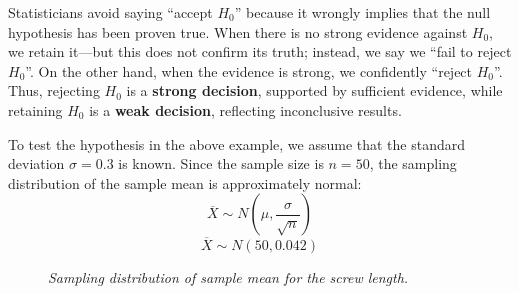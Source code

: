 \documentclass[twoside]{book}
\begin{document}
Statisticians avoid saying ``accept $H_0$'' because it wrongly implies that the null hypothesis has been proven true. When there is no strong evidence against $H_0$, we retain it—but this does not confirm its truth; instead, we say we ``fail to reject $H_0$''. On the other hand, when the evidence is strong, we confidently ``reject $H_0$''. Thus, rejecting $H_0$ is a \textbf{strong decision}, supported by sufficient evidence, while retaining $H_0$ is a \textbf{weak decision}, reflecting inconclusive results.

To test the hypothesis in the above example, we assume that the
standard deviation $\sigma = 0.3$ is known. Since the sample size is $n = 50$, the sampling distribution of the sample mean is approximately normal: \[
    \overline{X} \sim N\left( \mu, \frac{\sigma}{\sqrt{n}} \right)
    \]
     \[
    \overline{X} \sim N\left( 50, 0.042 \right)
    \]

\begin{figure}[h]
\begin{center}
\end{center}
\caption{\textit{Sampling distribution of sample mean for the screw length.}}
\label{fig:sampling_dist_screw_mean}
\end{figure}

\end{document}
